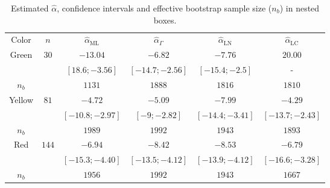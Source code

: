 \documentclass[twocolumn]{svjour3}
\begin{document}
\begin{table}[hbt]
	\centering
	\caption{Estimated $\widehat{\alpha}$, confidence intervals and effective bootstrap sample size ($n_b$) in nested boxes.}\label{ResultadosCorner} 
	\begin{tabular}{c*5{c}}
		\toprule
		Color       &  $n$    &  $\widehat{\alpha}_{\text{{ML}}}$    &  $\widehat{\alpha}_{\Gamma}$  &  $\widehat{\alpha}_{\text{{LN}}}$ &  $\widehat{\alpha}_{\text{{LC}}}$\\
		\cmidrule(lr){1-6}
		Green       & $30$  & $-13.04$  & $-6.82$  & $-7.76$     &  $20.00$  \\
		&                   & $[18.6;-3.56]$ & $[-14.7;-2.56]$  & $[-15.4;-2.5]$ & -\\
		$n_{b}$    	&       &  $1131$         & $1888$            &  $1816$          &   $1810$       \\ \midrule
		Yellow     & $81$   & $-4.72$  & $-5.0$9   & $-7.99$     &  $-4.29$    \\
		&       & $[-10.8;-2.97]$ & $[-9;-2.82]$ & $[-14.4;-3.41]$ & $[-13.7;-2.43]$\\
		$n_{b}$    	&       & $1989$          &  $1992$         &   $1943$        &  $1893$        \\ \midrule
		Red        & $144$  & $-6.94$  & $-8.42$   & $-8.53$     &   $-6.79$\\
		&           & $[-15.3;-4.40]$ & $[-13.5;-4.12]$ & $[-13.9;-4.12]$ & $[-16.6;-3.28]$\\
		$n_{b}$    	&       & $1956$          &  $1992$         &  $1943$         & $1667$         \\ \midrule
		\bottomrule
	\end{tabular}
\end{table} 
\end{document}
